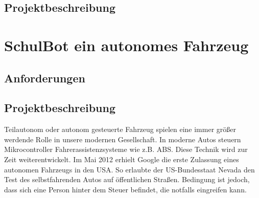 \subsection{Projektbeschreibung}

\section{SchulBot ein autonomes Fahrzeug}

\subsection{Anforderungen}
\begin{table}[h]
 \begin{center}
  
\end{center}
\caption{}
\label{tab:}
\end{table}%

\subsection{Projektbeschreibung}
Teilautonom oder autonom gesteuerte Fahrzeug spielen eine immer größer werdende Rolle in unsere modernen Gesellschaft. In moderne Autos steuern Mikrocontroller Fahrerassistenzsysteme wie z.B. ABS. Diese Technik wird zur Zeit weiterentwickelt. Im Mai 2012 erhielt Google die erste Zulassung eines autonomen Fahrzeugs in den USA. So erlaubte der US-Bundesstaat Nevada den Test des selbstfahrenden Autos auf öffentlichen Straßen. Bedingung ist jedoch, dass sich eine Person hinter dem Steuer befindet, die notfalls eingreifen kann.

